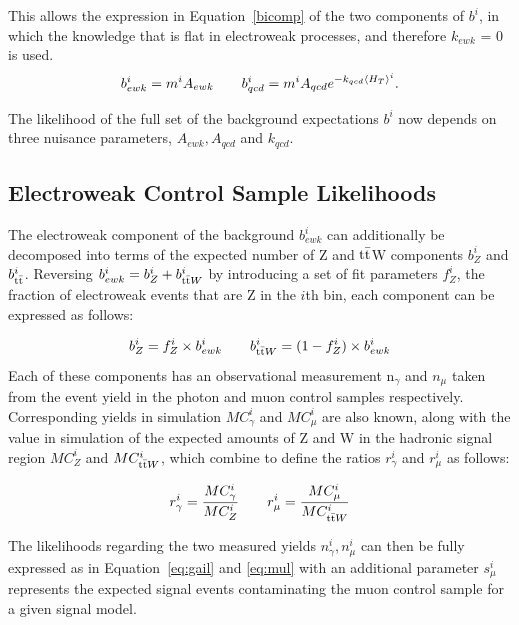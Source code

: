 This allows the expression in Equation~\ref{bicomp} of the two components of $b^{i}$, in which the knowledge that \RaT is flat in electroweak processes, and therefore $k_{ewk}$ = 0 is used.
\begin{equation}
b^{i}_{ewk} = m^{i} A_{ewk} \qquad
b^{i}_{qcd} = m^{i} A_{qcd} e^{-k_{qcd} \langle H_{T}  \rangle^{i}}.
\label{eq:bicomp}
\end{equation}

The likelihood of the full set of the background expectations $b^{i}$ now depends on three nuisance parameters, $A_{ewk}, A_{qcd}$ and $k_{qcd}$. 

\subsection{Electroweak Control Sample Likelihoods}
The electroweak component of the background $b^{i}_{ewk}$ can additionally be decomposed into terms of the expected number of Z and $\textrm{t}\bar{\textrm{t}}$W components $b^{i}_{Z}$ and  $b^{i}_{\textrm{t}\bar{\textrm{t}}}$. Reversing $b^{i}_{ewk} = b^{i}_{Z} + b^{i}_{\textrm{t}\bar{\textrm{t}} W}$ by introducing a set of fit parameters $f^{i}_{Z}$, the fraction of electroweak events that are Z in the $i$th bin, each component can be expressed as follows:

\begin{equation}
b^{i}_{Z}= f^{i}_{Z} \times b^{i}_{ewk} \qquad b^{i}_{\textrm{t}\bar{\textrm{t}} W}= (1 - f^{i}_{Z}) \times b^{i}_{ewk}
\label{eq:ewk1}
\end{equation}
 Each of these components has an observational measurement n$_{\gamma}$ and $n_{\mu}$ taken from the event yield in the photon and muon control samples respectively. Corresponding yields in simulation $MC^{i}_{\gamma}$ and $MC^{i}_{\mu}$ are also known, along with the value in simulation of the expected amounts of Z and \tto W in the hadronic signal region $MC^{i}_{Z}$ and $MC^{i}_{\textrm{t}\bar{\textrm{t}} W}$, which combine to define the ratios $r^{i}_{\gamma}$ and $r^{i}_{\mu}$ as follows:
 
 \begin{equation}
 r^{i}_{\gamma} = \frac{MC^{i}_{\gamma}}{MC^{i}_{Z}} \qquad  r^{i}_{\mu} = \frac{MC^{i}_{\mu}}{MC^{i}_{\textrm{t}\bar{\textrm{t}} W}} 
 \label{eq:ewk2}
 \end{equation}

The likelihoods regarding the two measured yields $n^{i}_{\gamma}, n^{i}_{\mu}$ can then be fully expressed as in Equation~\ref{eq:gail} and \ref{eq:mul} with an additional parameter $s^{i}_{\mu}$ represents the expected signal events contaminating the muon control sample for a given signal model. 

